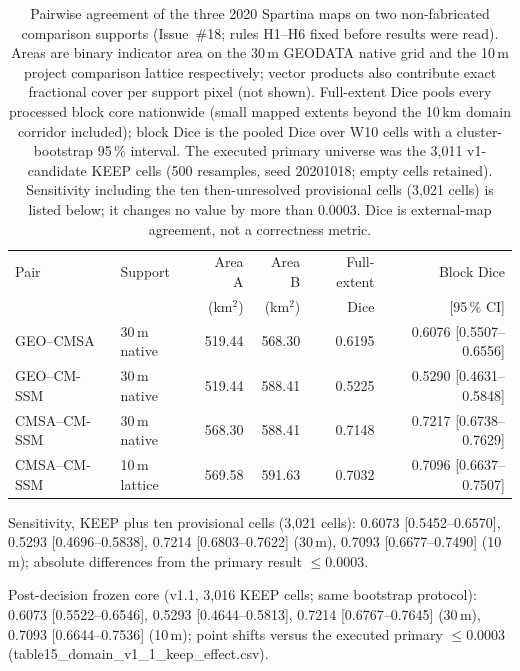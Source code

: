 \begin{table}[t]
\centering
\small
\setlength{\tabcolsep}{4pt}
\caption{Pairwise agreement of the three 2020 Spartina maps on two
non-fabricated comparison supports (Issue~\#18; rules H1--H6 fixed
before results were read). Areas are binary indicator area on the 30\,m
GEODATA native grid and the 10\,m project comparison lattice
respectively; vector products also contribute exact fractional cover
per support pixel (not shown). Full-extent Dice pools every processed
block core nationwide (small mapped extents beyond the 10\,km domain
corridor included); block Dice is the pooled Dice over W10 cells with a
cluster-bootstrap 95\,\% interval. The executed primary universe was
the 3{,}011 v1-candidate KEEP cells (500 resamples, seed 20201018;
empty cells retained). Sensitivity including the ten then-unresolved
provisional cells (3{,}021 cells) is listed below; it changes no value
by more than 0.0003. Dice is external-map agreement, not a correctness
metric.}
\label{tab:labeldisagreement2020}
\begin{tabular}{llrrrr}
\toprule
Pair & Support & Area A & Area B & Full-extent & Block Dice \\
 & & (km$^2$) & (km$^2$) & Dice & [95\,\% CI] \\
\midrule
GEO--CMSA   & 30\,m native  & 519.44 & 568.30 & 0.6195 & 0.6076 [0.5507--0.6556] \\
GEO--CM-SSM & 30\,m native  & 519.44 & 588.41 & 0.5225 & 0.5290 [0.4631--0.5848] \\
CMSA--CM-SSM & 30\,m native & 568.30 & 588.41 & 0.7148 & 0.7217 [0.6738--0.7629] \\
CMSA--CM-SSM & 10\,m lattice & 569.58 & 591.63 & 0.7032 & 0.7096 [0.6637--0.7507] \\
\bottomrule
\end{tabular}

\vspace{2pt}
{\footnotesize Sensitivity, KEEP plus ten provisional cells
(3{,}021 cells): 0.6073 [0.5452--0.6570], 0.5293 [0.4696--0.5838],
0.7214 [0.6803--0.7622] (30\,m), 0.7093 [0.6677--0.7490] (10\,m);
absolute differences from the primary result $\leq$0.0003.}

\vspace{2pt}
{\footnotesize Post-decision frozen core (v1.1, 3{,}016 KEEP cells;
same bootstrap protocol): 0.6073 [0.5522--0.6546],
0.5293 [0.4644--0.5813], 0.7214 [0.6767--0.7645] (30\,m),
0.7093 [0.6644--0.7536] (10\,m); point shifts versus the executed
primary $\leq$0.0003
(table15\_domain\_v1\_1\_keep\_effect.csv).}
\end{table}

